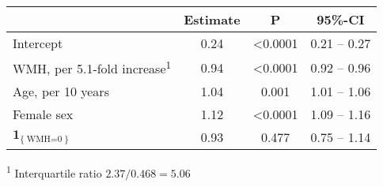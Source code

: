 \begin{table}
\centering
\setlength{\LTpost}{0mm}
\begin{longtable}{lccc}
\toprule
 & Estimate & P & 95\%-CI \\ 
\midrule
Intercept & 0.24 & <0.0001 & 0.21 -- 0.27 \\ 
WMH, per 5.1-fold increase\textsuperscript{1} & 0.94 & <0.0001 & 0.92 -- 0.96 \\ 
Age, per 10 years & 1.04 & 0.001 & 1.01 -- 1.06 \\ 
Female sex & 1.12 & <0.0001 & 1.09 -- 1.16 \\ 
$\mathbf{1}_{\{\operatorname{WMH=0}\}}$ & 0.93 & 0.477 & 0.75 -- 1.14 \\ 
\bottomrule
\end{longtable}
\textsuperscript{1} Interquartile ratio $2.37/0.468=5.06$
\label{tab:hyp1}
\end{table}
